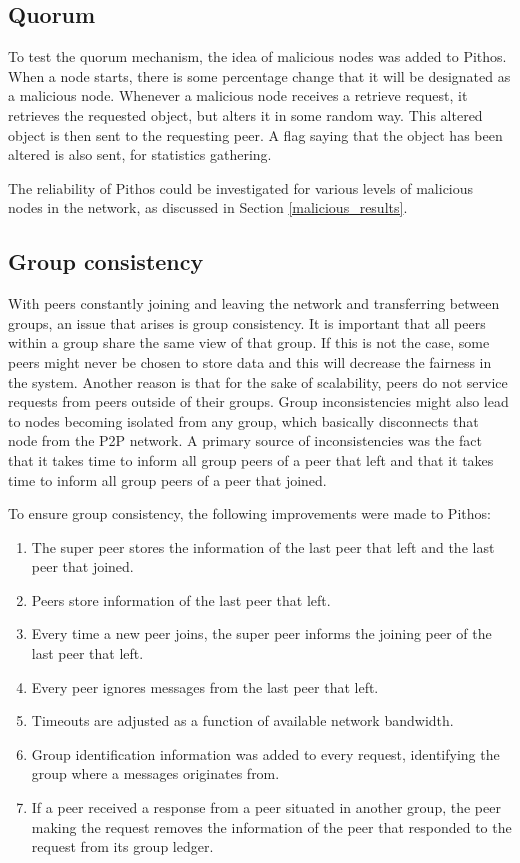 \subsection{Quorum}
\label{object_verification_implementation}

To test the quorum mechanism, the idea of malicious nodes was added to Pithos. When a node starts, there is some percentage change that it will be designated as a malicious node. Whenever a malicious node receives a retrieve request, it retrieves the requested object, but alters it in some random way. This altered object is then sent to the requesting peer. A flag saying that the object has been altered is also sent, for statistics gathering.

The reliability of Pithos could be investigated for various levels of malicious nodes in the network, as discussed in Section \ref{malicious_results}.

\subsection{Group consistency}
\label{group_consistency_implementation}

With peers constantly joining and leaving the network and transferring between groups, an issue that arises is group consistency. It is important that all peers within a group share the same view of that group. If this is not the case, some peers might never be chosen to store data and this will decrease the fairness in the system. Another reason is that for the sake of scalability, peers do not service requests from peers outside of their groups. Group inconsistencies might also lead to nodes becoming isolated from any group, which basically disconnects that node from the P2P network. A primary source of inconsistencies was the fact that it takes time to inform all group peers of a peer that left and that it takes time to inform all group peers of a peer that joined.

To ensure group consistency, the following improvements were made to Pithos:
%
\begin{enumerate}
\item The super peer stores the information of the last peer that left and the last peer that joined.
\item Peers store information of the last peer that left.
\item Every time a new peer joins, the super peer informs the joining peer of the last peer that left.
\item Every peer ignores messages from the last peer that left.
\item Timeouts are adjusted as a function of available network bandwidth.
\item Group identification information was added to every request, identifying the group where a messages originates from.
\item If a peer received a response from a peer situated in another group, the peer making the request removes the information of the peer that responded to the request from its group ledger.
\end{enumerate}

